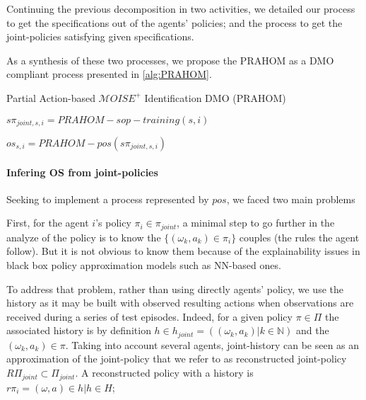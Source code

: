 \documentclass{ecai}
\begin{document}
Continuing the previous decomposition in two activities, we detailed our process to get the specifications out of the agents' policies; and the process to get the joint-policies satisfying given specifications.

As a synthesis of these two processes, we propose the PRAHOM as a DMO compliant process presented in \autoref{alg:PRAHOM}.


\begin{algorithm}[hbt!]
    \caption{Partial Action-based $\mathcal{M}OISE^+$ Identification DMO (PRAHOM)}\label{alg:PRAHOM}



    $s\pi_{joint,s,i} = PRAHOM-sop-training(s,i)$

    $os_{s,i} = PRAHOM-pos(s\pi_{joint,s,i})$

\end{algorithm}

\paragraph{\textbf{Infering OS from joint-policies}}

Seeking to implement a process represented by $pos$, we faced two main problems

First, for the agent $i$'s policy $\pi_{i} \in \pi_{joint}$, a minimal step to go further in the analyze of the policy is to know the $\{(\omega_k, a_k) \in \pi_{i}\}$ couples (the rules the agent follow). But it is not obvious to know them because of the explainability issues in black box policy approximation models such as NN-based ones.

To address that problem, rather than using directly agents' policy, we use the history as it may be built with observed resulting actions when observations are received during a series of test episodes. Indeed, for a given policy $\pi \in \Pi$ the associated history is by definition $h \in h_{joint} = ((\omega_k,a_k) | k \in \mathbb{N})$ and the $(\omega_k,a_k) \in \pi$. Taking into account several agents, joint-history can be seen as an approximation of the joint-policy that we refer to as reconstructed joint-policy $R\Pi_{joint} \subset \Pi_{joint}$. A reconstructed policy with a history is $r\pi_i = {(\omega, a) \in h | h \in H}$;
\end{document}
